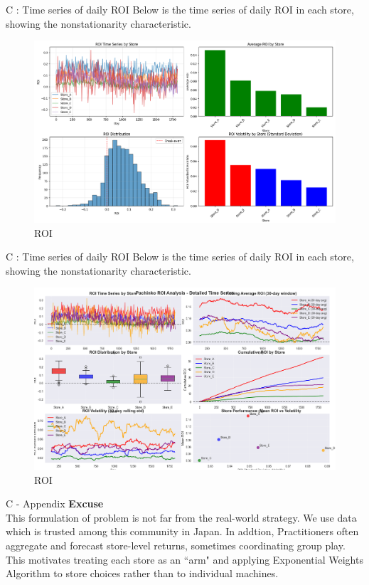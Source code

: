 \documentclass{beamer}
\begin{document}
\begin{frame}{C : Time series of daily ROI}
Below is the time series of daily ROI in each store, showing the nonstationarity characteristic.
\begin{figure}
    \centering
    \includegraphics[width=0.8\linewidth]{332Project2/figures/ROI.png}
    \caption{ROI}
    \label{fig:placeholder}
\end{figure}
    
\end{frame}

\begin{frame}{C : Time series of daily ROI}
Below is the time series of daily ROI in each store, showing the nonstationarity characteristic.
    \begin{figure}
        \centering
        \includegraphics[width=0.8\linewidth]{332Project2/figures/ROI_detailed.png}
        \caption{ROI}
        \label{fig:placeholder}
    \end{figure}
\end{frame}


\begin{frame}{C - Appendix}
    \textbf{Excuse}\\
    This formulation of problem is not far from the real-world strategy. We use data which is trusted among this community in Japan. In addtion, Practitioners often aggregate and forecast store-level returns, sometimes coordinating group play.\\
    This motivates treating each store as an “arm" and applying Exponential Weights Algorithm to store choices rather than to individual machines. 
\end{frame}
\end{document}
